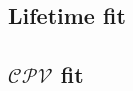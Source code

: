 \documentclass[preprint,aps,showpacs]{revtex4}
\newcommand{\cpvconj}{\ensuremath{\mathcal{CPV}}\xspace}
\newcommand{\etasubgg}{\ensuremath{\eta_{\gamma\gamma}}\xspace}
\newcommand{\etasubppp}{\ensuremath{\eta_{\pi^+\pi^-\pi^0}}\xspace}
\begin{document}
% 
\subsection{Lifetime fit}

\subsection{\cpvconj fit}

\clearpage
\end{document}
